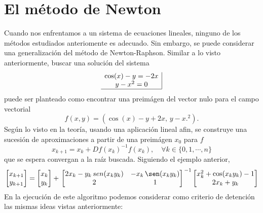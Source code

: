 \documentclass[letter,11pt]{article}
\newcommand\0{\mathbf{0}}
\begin{document}
\section{El m\'etodo de Newton}
Cuando nos enfrentamos a un sistema de ecuaciones lineales, ninguno de los m\'etodos estudiados anteriomente es adecuado. Sin embargo, se puede considerar una generalizaci\'on del m\'etodo de Newton-Raphson. Similar a lo visto anteriormente, buscar una soluci\'on del sistema
$$
\begin{array}{c|}
\cos(x)-y=-2x\\
y-x^2=0 \\
\hline
\end{array}
$$
puede ser planteado como encontrar una preim\'agen del vector nulo para el campo vectorial
$$
f(x,y)=(\cos(x)-y+2x,\,y-x.^2).
$$
Seg\'un lo visto en la teor\'ia, usando una aplicaci\'on lineal afin, se construye una sucesi\'on de aproximaciones a partir de una preim\'agen $x_0$ para $f$
$$
x_{k+1}=x_k+Df(x_k)^{-1} f(x_k), \quad \forall k\in\{0,1,\cdots,n\}
$$
que se espera convergan a la ra\'iz buscada. Siguiendo el ejemplo anterior,
$$
\begin{bmatrix}
x_{k+1}\\y_{k+1}
\end{bmatrix}
=
\begin{bmatrix}
x_{k}\\y_{k}
\end{bmatrix}
+
\left.\begin{bmatrix}
2x_{k} -y_{k} \,sen(x_{k} y_{k}) & - x_{k}\,\sen(x_{k} y_{k}) \\
2 & 1
\end{bmatrix} \right.^{-1}
\begin{bmatrix}
 x_{k}^2+\cos(x_{k} y_{k})-1\\
2x_{k}+y_{k}
\end{bmatrix}
$$
En la ejecuci\'on de este algoritmo podemos considerar como criterio de detenci\'on las mismas ideas vistas anteriormente:
\end{document}
